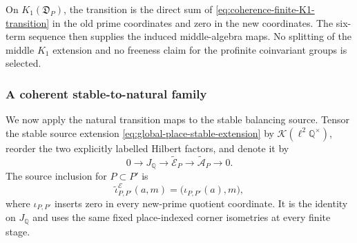 On $K_1(\mathfrak D_P)$, the transition is the direct sum of
\eqref{eq:coherence-finite-K1-transition} in the old prime coordinates and
zero in the new coordinates.  The six-term sequence then supplies the induced
middle-algebra maps.  No splitting of the middle $K_1$ extension and no
freeness claim for the profinite coinvariant groups is selected.

\subsubsection{A coherent stable-to-natural family}

We now apply the natural transition maps to the stable balancing source.
Tensor the stable source extension
\eqref{eq:global-place-stable-extension} by
$\mathcal K(\ell^2\mathbb Q^\times)$, reorder the two explicitly labelled
Hilbert factors, and denote it by
\begin{equation}
 0\longrightarrow J_{\mathbb Q}\longrightarrow
 \widetilde{\mathcal E}_P\longrightarrow
 \widetilde{\mathcal A}_P\longrightarrow0.
 \label{eq:coherence-tail-stabilized-source-extension}
\end{equation}
The source inclusion for $P\subset P'$ is
\begin{equation}
 \widetilde\iota^{\mathcal E}_{P,P'}(a,m)
 =\bigl(\iota_{P,P'}(a),m\bigr),
 \label{eq:coherence-source-extension-transition}
\end{equation}
where $\iota_{P,P'}$ inserts zero in every new-prime quotient coordinate.
It is the identity on $J_{\mathbb Q}$ and uses the same fixed place-indexed
corner isometries at every finite stage.

